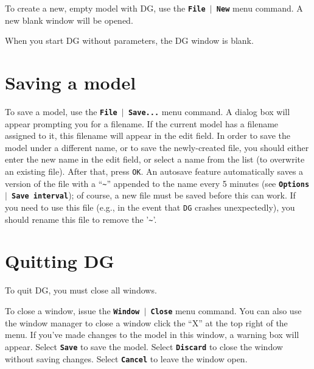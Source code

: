 \documentclass[12pt]{report}
\begin{document}
To create a new, empty model with DG, use the
\textbf{\texttt{File  \begin{math}\vert{}\end{math}  New}} menu command. A
new blank window will be opened.

When you start DG without parameters, the DG window is blank.

\section{Saving a model}

To save a model, use the
\textbf{\texttt{File  \begin{math}\vert{}\end{math}  Save...}} menu
command. A dialog box will appear prompting you for a filename. If the
current model has a filename assigned to it, this filename will appear
in the edit field. In order to save the model under a different name,
or to save the newly-created file, you should either enter the new name
in the edit field, or select a name from the list (to overwrite an
existing file). After that, press \texttt{OK}.  An autosave feature
automatically saves a version of the file with a ``\verb+~+'' 
appended to the
name every 5 minutes (see 
\textbf{\texttt{Options  \begin{math}\vert{}\end{math}  Save interval}});
of course, a new file must
be saved before this can work.  If you need to use this file (e.g.,
in the event that \verb!DG! crashes unexpectedly), you should rename this
file to remove the '\verb!~!'.

\section{Quitting DG}

To quit DG, you must close all windows.

To close a window, issue the
\textbf{\texttt{Window  \begin{math}\vert{}\end{math}  Close}} menu
command. You can also use the window manager to close a window
click the ``X'' at the top right of the menu. 
If you've
made changes to the model in this window, a warning box will appear.
Select \textbf{\texttt{Save}} to save the model. Select
\textbf{\texttt{Discard}} to close the window without saving changes.
Select \textbf{\texttt{Cancel}} to leave the window open.
\end{document}

